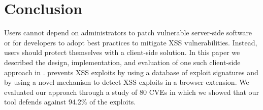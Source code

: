 \section{Conclusion}

Users cannot depend on administrators to patch vulnerable server-side
software or for developers to adopt best practices to mitigate XSS
vulnerabilities. Instead, users should protect themselves with a
client-side solution. In this paper we described the design,
implementation, and evaluation of one such client-side approach in
\sys.
%
\sys prevents \ac{XSS} exploits by using a database of exploit
signatures and by using a novel mechanism to detect XSS exploits in a
browser extension.
%
We evaluated our approach through a study of 80 CVEs in which we
showed that our tool defends against 94.2\% of the exploits.




